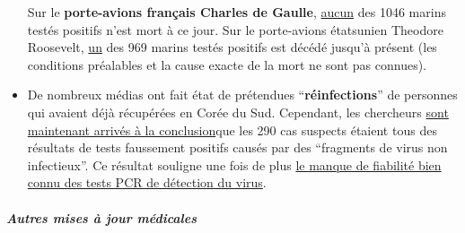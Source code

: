 \begin{itemize}
  Sur le \textbf{porte-avions français Charles de Gaulle},
  \href{https://en.wikipedia.org/wiki/COVID-19_pandemic_on_Charles_de_Gaulle}{aucun}
  des 1046 marins testés positifs n'est mort à ce jour. Sur le
  porte-avions étatsunien Theodore Roosevelt,
  \href{https://en.wikipedia.org/wiki/COVID-19_pandemic_on_USS_Theodore_Roosevelt}{un}
  des 969 marins testés positifs est décédé jusqu'à présent (les
  conditions préalables et la cause exacte de la mort ne sont pas
  connues).
\item
  De nombreux médias ont fait état de prétendues
  ``\textbf{réinfections}'' de personnes qui avaient déjà récupérées en
  Corée du Sud. Cependant, les chercheurs
  \href{https://www.independent.co.uk/news/world/asia/coronavirus-south-korea-patients-infected-twice-test-a9491986.html}{sont
  maintenant arrivés à la conclusion}que les 290 cas suspects étaient
  tous des résultats de tests faussement positifs causés par des
  ``fragments de virus non infectieux''. Ce résultat souligne une fois
  de plus \href{https://www.ncbi.nlm.nih.gov/pubmed/32219885}{le manque
  de fiabilité bien connu des tests PCR de détection du virus}.
\end{itemize}

\hypertarget{autres-mises-uxe0-jour-muxe9dicales}{%
\subparagraph{\texorpdfstring{\textbf{Autres mises à jour
médicales}}{Autres mises à jour médicales}}\label{autres-mises-uxe0-jour-muxe9dicales}}

